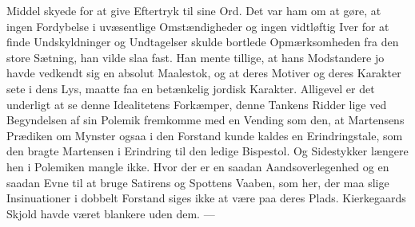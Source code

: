 \documentclass[12pt,a4paper,openany]{book}
\begin{document}
Middel skyede for at give Eftertryk til sine Ord. Det
var ham om at gøre, at ingen Fordybelse i uvæsentlige
Omstændigheder og ingen vidtløftig Iver for at finde
Undskyldninger og Undtagelser skulde bortlede Opmærksomheden
fra den store Sætning, han vilde slaa fast.
Han mente tillige, at hans Modstandere jo havde vedkendt
sig en absolut Maalestok, og at deres Motiver og
deres Karakter sete i dens Lys, maatte faa en betænkelig
jordisk Karakter. Alligevel er det underligt at se denne
Idealitetens Forkæmper, denne Tankens Ridder lige ved
Begyndelsen af sin Polemik fremkomme med en Vending
som den, at Martensens Prædiken om Mynster ogsaa i
den Forstand kunde kaldes en Erindringstale, som den
bragte Martensen i Erindring til den ledige Bispestol.
Og Sidestykker længere hen i Polemiken mangle ikke.
Hvor der er en saadan Aandsoverlegenhed og en saadan
Evne til at bruge Satirens og Spottens Vaaben, som her,
der maa slige Insinuationer i dobbelt Forstand siges ikke
at være paa deres Plads. Kierkegaards Skjold havde
været blankere uden dem. ---
\end{document}
